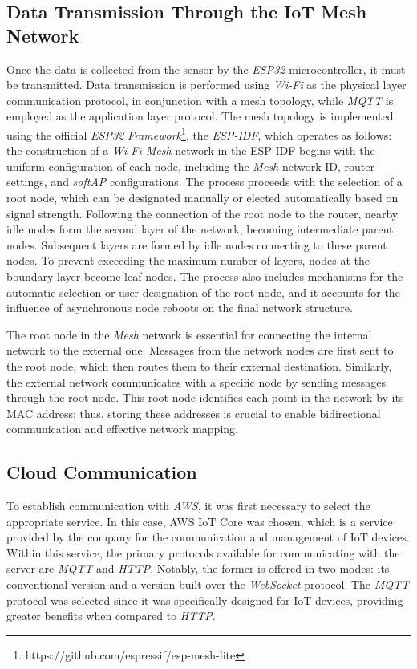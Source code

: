 \documentclass[journal]{IEEEtran}
\begin{document}
\subsection{Data Transmission Through the IoT Mesh Network}
Once the data is collected from the sensor by the \textit{ESP32} microcontroller, it must be transmitted. Data transmission is performed using \textit{Wi-Fi} as the physical layer communication protocol, in conjunction with a mesh topology, while \textit{MQTT} is employed as the application layer protocol. The mesh topology is implemented using the official \textit{ESP32} \textit{Framework}\footnote{https://github.com/espressif/esp-mesh-lite}, the \textit{ESP-IDF}, which operates as follows: the construction of a \textit{Wi-Fi Mesh} network in the ESP-IDF begins with the uniform configuration of each node, including the \textit{Mesh} network ID, router settings, and \textit{softAP} configurations. The process proceeds with the selection of a root node, which can be designated manually or elected automatically based on signal strength. Following the connection of the root node to the router, nearby idle nodes form the second layer of the network, becoming intermediate parent nodes. Subsequent layers are formed by idle nodes connecting to these parent nodes. To prevent exceeding the maximum number of layers, nodes at the boundary layer become leaf nodes. The process also includes mechanisms for the automatic selection or user designation of the root node, and it accounts for the influence of asynchronous node reboots on the final network structure.

The root node in the \textit{Mesh} network is essential for connecting the internal network to the external one. Messages from the network nodes are first sent to the root node, which then routes them to their external destination. Similarly, the external network communicates with a specific node by sending messages through the root node. This root node identifies each point in the network by its MAC address; thus, storing these addresses is crucial to enable bidirectional communication and effective network mapping.

\subsection{Cloud Communication}
To establish communication with \textit{AWS}, it was first necessary to select the appropriate service. In this case, AWS IoT Core was chosen, which is a service provided by the company for the communication and management of IoT devices. Within this service, the primary protocols available for communicating with the server are \textit{MQTT} and \textit{HTTP}. Notably, the former is offered in two modes: its conventional version and a version built over the \textit{WebSocket} protocol. The \textit{MQTT} protocol was selected since it was specifically designed for IoT devices, providing greater benefits when compared to \textit{HTTP}.
\end{document}

